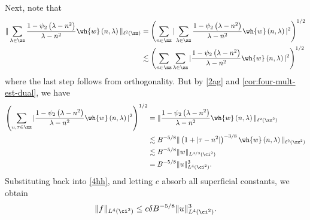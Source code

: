 %
%
Next, note 
that 
%
%
\begin{equation}
	\label{apply-ortho}
	\begin{split}
		\|\sum_{\lambda \in \zz}
		\frac{1 - \psi_2\left( \lambda - n^2 \right)}{\lambda - n^2} \wh{w} 
		\left( n, \lambda \right) \|_{\ell^2\left( \zz \right)}
		& = \left( \sum_{n \in \zz}  | \sum_{\lambda \in \zz}
		\frac{1 - \psi_2\left( \lambda - n^2 \right)}{\lambda - n^2} \wh{w} 
		\left( n, \lambda \right) |^2 \right )^{1/2}
		\\
		& \lesssim \left( \sum_{n \in \zz} \sum_{\lambda \in \zz} |
		\frac{1 - \psi_2\left( \lambda - n^2 \right)}{\lambda - n^2} 
		\wh{w}\left( n, \lambda \right) |^2 
		\right)^{1/2} 
	\end{split}
\end{equation}
%
%
where the last step follows from orthogonality. 
But by \eqref{2ag} and \cref{cor:four-mult-est-dual}, we have
\begin{equation*}
	\begin{split}
		\left( \sum_{n, \tau \in \zz} |
		\frac{1 - \psi_2\left( \lambda - n^2 \right)}{\lambda - n^2} 
		\wh{w}\left( n, \lambda \right) |^2 
		\right)^{1/2}
		& = \|\frac{1 - \psi_2 \left( \lambda - n^2 
		\right)}{\lambda - n^2} \wh{w}\left( n, \lambda \right) 
		\|_{\ell^2(\zz^2)}
		\\
		& \lesssim B^{-5/8} \|\left( 1 + |\tau - n^2| \right)^{-3/8} 
		\wh{w}\left( n, \lambda \right) \|_{\ell^2(\zz^2)}
		\\
		& \lesssim B^{-5/8} \|w\|_{L^{4/3}(\ci^2)}
		\\
		& = B^{-5/8} \|u\|_{L^4(\ci^2)}^3.
	\end{split}
\end{equation*}
%
%
Substituting back into \eqref{4hh}, and letting $c$ absorb all superficial 
constants, we obtain
%
%
\begin{equation}
	\label{main-int-3-est}
	\begin{split}
		\|f\|_{L^4(\ci^2)} \le c \delta B^{-5/8} 
		\|u\|_{L^4(\ci^2)}^3.
	\end{split}
\end{equation}
%
%
